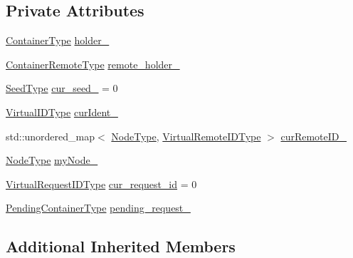 \subsection*{Private Attributes}
\begin{DoxyCompactItemize}
\item 
\hyperlink{structvt_1_1vrt_1_1_virtual_context_manager_ab36ffbed916fb2720dd6db71979a064e}{Container\+Type} \hyperlink{structvt_1_1vrt_1_1_virtual_context_manager_a25967c050488b45a6136e8ca683ad9f8}{holder\+\_\+}
\item 
\hyperlink{structvt_1_1vrt_1_1_virtual_context_manager_aa0314e4b3f1b39a531c7ba5b630fc72e}{Container\+Remote\+Type} \hyperlink{structvt_1_1vrt_1_1_virtual_context_manager_a27aaad47bba7196b28b9246d6d00a345}{remote\+\_\+holder\+\_\+}
\item 
\hyperlink{namespacevt_ae2e13198bdef4d5b8e603d6c1c7f0969}{Seed\+Type} \hyperlink{structvt_1_1vrt_1_1_virtual_context_manager_a5e7ca8ae11806bc82379e36180f610e7}{cur\+\_\+seed\+\_\+} = 0
\item 
\hyperlink{namespacevt_1_1vrt_a84d0891f52f70728c3fc2172cffb464b}{Virtual\+I\+D\+Type} \hyperlink{structvt_1_1vrt_1_1_virtual_context_manager_a0aeca2e6cb7e3096d0f6dce413c3bc0a}{cur\+Ident\+\_\+}
\item 
std\+::unordered\+\_\+map$<$ \hyperlink{namespacevt_a866da9d0efc19c0a1ce79e9e492f47e2}{Node\+Type}, \hyperlink{namespacevt_1_1vrt_a8184ab8c530ce523edcdc4f4c38565be}{Virtual\+Remote\+I\+D\+Type} $>$ \hyperlink{structvt_1_1vrt_1_1_virtual_context_manager_ae2c642a96358980259bc165cad68ae6c}{cur\+Remote\+I\+D\+\_\+}
\item 
\hyperlink{namespacevt_a866da9d0efc19c0a1ce79e9e492f47e2}{Node\+Type} \hyperlink{structvt_1_1vrt_1_1_virtual_context_manager_a543388bdb406506b6cedd94205bc3efd}{my\+Node\+\_\+}
\item 
\hyperlink{namespacevt_1_1vrt_ac7ef8820ebfc383fa16f09bf46eaa2b8}{Virtual\+Request\+I\+D\+Type} \hyperlink{structvt_1_1vrt_1_1_virtual_context_manager_a6112cb97539b0db05f3b3f03331f82da}{cur\+\_\+request\+\_\+id} = 0
\item 
\hyperlink{structvt_1_1vrt_1_1_virtual_context_manager_a85080f8107ed08c3a7fdd8114c724ce2}{Pending\+Container\+Type} \hyperlink{structvt_1_1vrt_1_1_virtual_context_manager_ac9b1471a8c9a3129181d44badc5a2f3b}{pending\+\_\+request\+\_\+}
\end{DoxyCompactItemize}
\subsection*{Additional Inherited Members}


